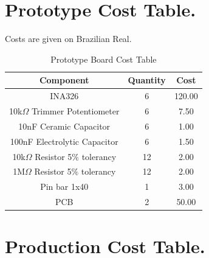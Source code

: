 \chapter{Prototype Cost Table.}

Costs are given on Brazilian Real.\\
\begin{table}[htb]
  \begin{center}
    \ABNTEXreducedfont
    \caption[Prototype Board Cost Table]{Prototype Board Cost Table}
    \label{Prototype-cost}
    \begin{tabular}{|c|c|c|}
      \hline
    Component & Quantity & Cost \\ \hline
    INA326 & 6 & 120.00\\ \hline
    10k$\Omega$ Trimmer Potentiometer & 6 & 7.50 \\ \hline
    10nF Ceramic Capacitor & 6 & 1.00 \\ \hline
    100nF Electrolytic Capacitor & 6 & 1.50 \\ \hline
    10k$\Omega$ Resistor 5$\%$ tolerancy & 12 & 2.00 \\ \hline
    1M$\Omega$ Resistor 5$\%$ tolerancy & 12 & 2.00 \\ \hline
    Pin bar 1x40 & 1 & 3.00 \\ \hline
    PCB & 2 & 50.00 \\ \hline
  \end{tabular}
\end{center}
\end{table}

\chapter{Production Cost Table.}

